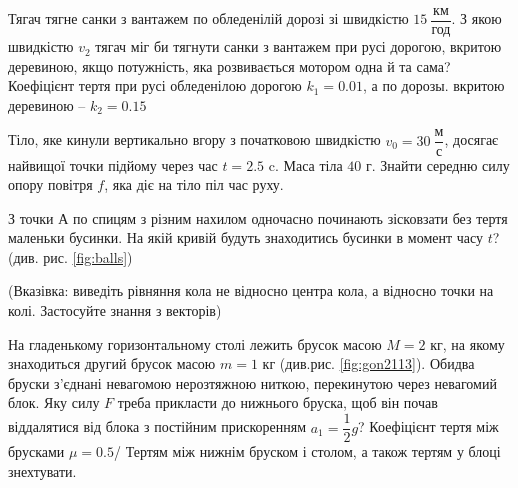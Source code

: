 \begin{problem}{4}
	Тягач тягне санки з вантажем по обледенілій дорозі зі швидкістю $15~ \dfrac{\text{км}}{\text{год}}$. З якою швидкістю $v_2$ тягач міг би тягнути санки з вантажем при русі дорогою, вкритою деревиною, якщо потужність, яка розвивається мотором одна й та сама? Коефіцієнт тертя при русі обледенілою дорогою $k_1 = 0.01$, а по дорозы. вкритою деревиною -- $k_2 = 0.15$
\end{problem}

\begin{problem}{5}
	Тіло, яке кинули вертикально вгору з початковою швидкістю $v_0 = 30~\dfrac{\text{м}}{\text{с}} $, досягає найвищої точки підйому через час $t = 2.5$ c. Маса тіла $40$ г. Знайти середню силу опору повітря $f$, яка діє на тіло піл час руху. 
\end{problem}


\begin{problem}{8}
	З точки А по спицям з різним нахилом одночасно починають зісковзати без тертя маленьки бусинки. На якій кривій будуть знаходитись бусинки в момент часу $t$? (див. рис. \ref{fig:balls})

	(Вказівка: виведіть рівняння кола не відносно центра кола, а відносно точки на колі. Застосуйте знання з векторів)	
\end{problem}

\begin{problem}{9}
	На гладенькому горизонтальному столі лежить брусок  масою $M = 2$ кг, на якому знаходиться другий брусок масою $m = 1$ кг (див.рис. \ref{fig:gon2113}). Обидва бруски з'єднані невагомою нерозтяжною ниткою, перекинутою через невагомий блок. Яку силу $F$ треба прикласти до нижнього бруска, щоб він почав віддалятися від блока з постійним прискоренням $a_1 = \dfrac{1}{2}g$? Коефіцієнт тертя між брусками $\mu = 0.5$/ Тертям між нижнім бруском і столом, а також тертям у блоці знехтувати.
\end{problem}